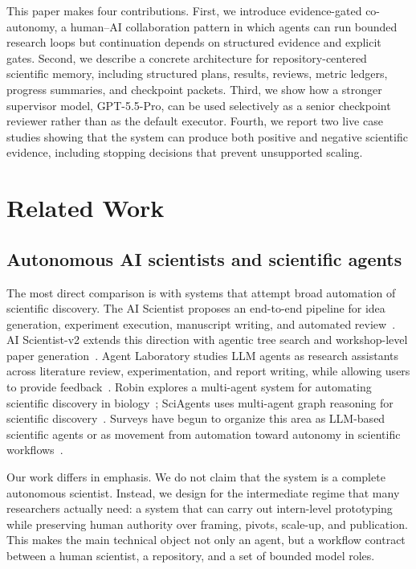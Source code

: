 \documentclass{article}
\newcommand{\gptpro}{GPT-5.5-Pro}
\begin{document}
This paper makes four contributions. First, we introduce evidence-gated co-autonomy, a human--AI collaboration pattern in which agents can run bounded research loops but continuation depends on structured evidence and explicit gates. Second, we describe a concrete architecture for repository-centered scientific memory, including structured plans, results, reviews, metric ledgers, progress summaries, and checkpoint packets. Third, we show how a stronger supervisor model, \gptpro, can be used selectively as a senior checkpoint reviewer rather than as the default executor. Fourth, we report two live case studies showing that the system can produce both positive and negative scientific evidence, including stopping decisions that prevent unsupported scaling.

\section{Related Work}

\subsection{Autonomous AI scientists and scientific agents}

The most direct comparison is with systems that attempt broad automation of scientific discovery. The AI Scientist proposes an end-to-end pipeline for idea generation, experiment execution, manuscript writing, and automated review~\citep{lu2024aiscientist}. AI Scientist-v2 extends this direction with agentic tree search and workshop-level paper generation~\citep{yamada2025aiscientistv2}. Agent Laboratory studies LLM agents as research assistants across literature review, experimentation, and report writing, while allowing users to provide feedback~\citep{schmidgall2025agentlab}. Robin explores a multi-agent system for automating scientific discovery in biology~\citep{ghareeb2025robin}; SciAgents uses multi-agent graph reasoning for scientific discovery~\citep{ghafarollahi2024sciagents}. Surveys have begun to organize this area as LLM-based scientific agents or as movement from automation toward autonomy in scientific workflows~\citep{ren2025scientificagents,zheng2025automationautonomy,zhang2025scientificmethod}.

Our work differs in emphasis. We do not claim that the system is a complete autonomous scientist. Instead, we design for the intermediate regime that many researchers actually need: a system that can carry out intern-level prototyping while preserving human authority over framing, pivots, scale-up, and publication. This makes the main technical object not only an agent, but a workflow contract between a human scientist, a repository, and a set of bounded model roles.
\end{document}
